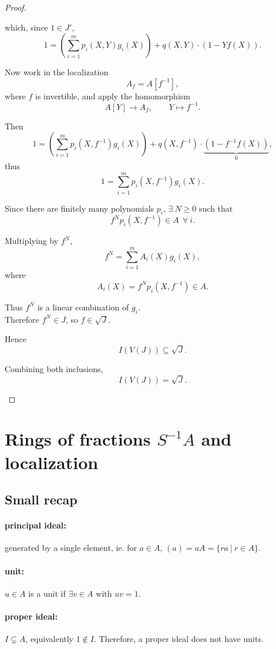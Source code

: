 \documentclass{article}
\theoremstyle{definition}
\begin{document}
\begin{proof}
\begin{enumerate}[a.]
  which, since $1 \in J'$,
  $$1= \left( \sum_{i=1}^m p_i(X,Y) g_i(X) \right) + q(X,Y) \cdot (1 - Y f(X)).$$

  Now work in the localization
  $$A_f=A[f^{-1}],$$
  where $f$ is invertible, and apply the homomorphism
  $$A[Y]\longrightarrow A_f,\qquad Y\longmapsto f^{-1}.$$

  Then
  $$1= \left( \sum_{i=1}^m p_i(X,f^{-1}) g_i(X) \right)
  +q(X,f^{-1})\cdot \underbrace{(1-f^{-1}f(X))}_{0},$$
  thus
  $$1= \sum_{i=1}^m p_i(X,f^{-1}) g_i(X).$$

  Since there are finitely many polynomials $p_i$, $\exists~ N\geq 0$ such that
  $$f^N p_i(X,f^{-1})\in A ~~\forall~ i.$$

  Multiplying by $f^N$,
  $$f^N= \sum_{i=1}^m A_i(X) g_i(X),$$
  where
  $$A_i(X)=f^N p_i(X,f^{-1})\in A.$$

  Thus $f^N$ is a linear combination of $g_i$.\\
  Therefore $f^N \in J$, so $f \in \sqrt{J}$.

  Hence
  $$I(V(J))\subseteq\sqrt{J}.$$

  Combining both inclusions,
  $$I(V(J))=\sqrt{J}.$$
  \end{enumerate}
\end{proof}




\section{Rings of fractions $S^{-1}A$ and localization}

\subsection{Small recap}
\paragraph{principal ideal:} generated by a single element, ie. for $a \in A$, $(a)=aA=\{ra ~|~ r\in A\}$.

\paragraph{unit:} $u \in A$ is a unit if $\exists v \in A$ with $uv=1$.

\paragraph{proper ideal:} $I \subsetneq A$, equivalently $1 \not\in I$. Therefore, a proper ideal does not have units.
\end{document}

